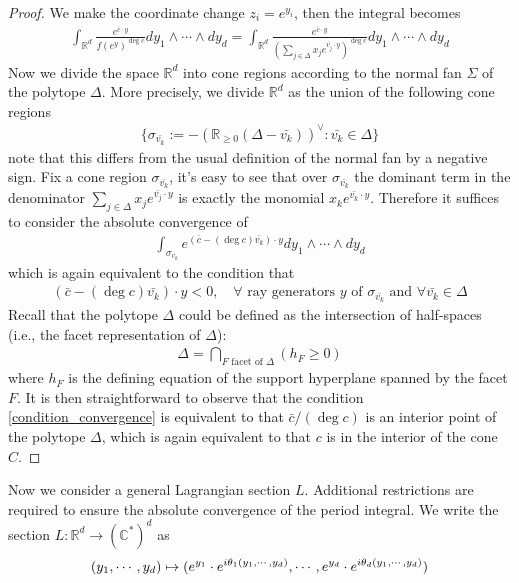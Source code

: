 \documentclass[11pt,reqno]{amsart}
\def\CC {{\mathbb C}}
\def\R {{\mathbb R}}
\theoremstyle{definition}
\numberwithin{equation}{section}
\begin{document}
\begin{proof}
	We make the coordinate change $z_i = e^{y_i}$, then the integral becomes
	\begin{align*}
		\int_{\R^d}\frac{e^{\bar{c}\cdot y}}{f(e^{y})^{\deg c}}dy_1\wedge\cdots\wedge dy_d =\int_{\R^d}\frac{e^{\bar{c}\cdot y}}{(\sum_{j\in\Delta} x_j e^{\bar{v_j}\cdot y})^{\deg c}}dy_1\wedge\cdots\wedge dy_d 
	\end{align*}
	Now we divide the space $\R^d$ into cone regions according to the normal fan $\Sigma$ of the polytope $\Delta$. More precisely, we divide $\R^d$ as the union of the following cone regions
	\begin{align*}
		\{\sigma_{\bar{v_k}}:=-\left(\R_{\geq 0}(\Delta-\bar{v_k})\right)^{\vee}:\bar{v_k}\in\Delta\}
	\end{align*}
	note that this differs from the usual definition of the normal fan by a negative sign. Fix a cone region $\sigma_{\bar{v_k}}$, it's easy to see that over $\sigma_{\bar{v_k}}$ the dominant term in the denominator $\sum_{j\in\Delta} x_j e^{\bar{v_j}\cdot y}$ is exactly the monomial $x_k e^{\bar{v_k}\cdot y}$. Therefore it suffices to consider the absolute convergence of 
	\begin{align*}
		\int_{\sigma_{v_k}}e^{(\bar{c}-(\deg c)\bar{v_k})\cdot y}dy_1\wedge\cdots\wedge dy_d 
	\end{align*}
	which is again equivalent to the condition that
	\begin{align}\label{condition_convergence}
		(\bar{c}-(\deg c)\bar{v_k})\cdot y<0,\quad \forall \text{ ray generators }y \text{ of }\sigma_{\bar{v_k}} \text{ and } \forall \bar{v_k}\in\Delta
	\end{align}
  Recall that the polytope $\Delta$	could be defined as the intersection of half-spaces (i.e., the facet representation of $\Delta$):
	\begin{align*}
		\Delta = \bigcap_{F \text{ facet of } \Delta} (h_F\geq 0)
	\end{align*}
	where $h_F$ is the defining equation of the support hyperplane spanned by the facet $F$. It is then straightforward to observe that the condition \eqref{condition_convergence} is equivalent to that $\bar{c}/(\deg c)$ is an interior point of the polytope $\Delta$, which is again equivalent to that $c$ is in the interior of the cone $C$.
\end{proof}

\smallskip

Now we consider a general Lagrangian section $L$. Additional restrictions are required to ensure the absolute convergence of the period integral. We write the section $L:\R^d\rightarrow(\CC^*)^d$ as
\begin{align*}
	(y_1,\cdots,y_d)\mapsto (e^{y_1}\cdot e^{{\rm i}\theta_1(y_1,\cdots,y_d)},\cdots,e^{y_d}\cdot e^{{\rm i}\theta_d(y_1,\cdots,y_d)})
\end{align*}
\end{document}
